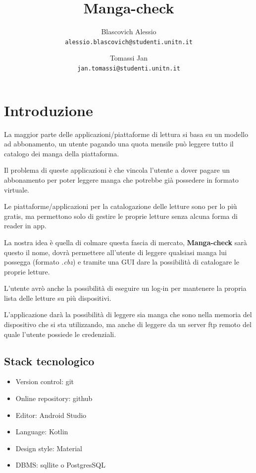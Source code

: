 \documentclass{report}
\title{Manga-check}
\author{Blascovich Alessio\\
	\texttt{alessio.blascovich@studenti.unitn.it}
	\and
	Tomassi Jan\\
	\texttt{jan.tomassi@studenti.unitn.it}
}
\begin{document}
\maketitle

\tableofcontents

\newpage

\chapter{Introduzione}

La maggior parte delle applicazioni/piattaforme di lettura si basa su un
modello ad abbonamento, un utente pagando una quota mensile può leggere
tutto il catalogo dei manga della piattaforma.

Il problema di queste applicazioni è che vincola l'utente a dover pagare
un abbonamento per poter leggere manga che potrebbe già possedere in
formato virtuale.

Le piattaforme/applicazioni per la catalogazione delle letture sono per
lo più gratis, ma permettono solo di gestire le proprie letture senza
alcuna forma di reader in app.

La nostra idea è quella di colmare questa fascia di mercato,
\textbf{Manga-check} sarà questo il nome, dovrà permettere all'utente di
leggere qualsiasi manga lui possegga (formato \emph{.cbz}) e tramite una GUI
dare la possibilità di catalogare le proprie letture.

L'utente avrò anche la possibilità di eseguire un log-in per mantenere
la propria lista delle letture su più dispositivi.

L'applicazione darà la possibilità di leggere sia manga che sono nella
memoria del dispositivo che si sta utilizzando, ma anche di leggere da
un server ftp remoto del quale l'utente possiede le credenziali.

\section{Stack tecnologico}
\begin{itemize}
	\item Version control: git
	\item Online repository: github
	\item Editor: Android Studio
	\item Language: Kotlin
	\item Design style: Material
	\item DBMS: sqllite o PostgresSQL
\end{itemize}
\end{document}
